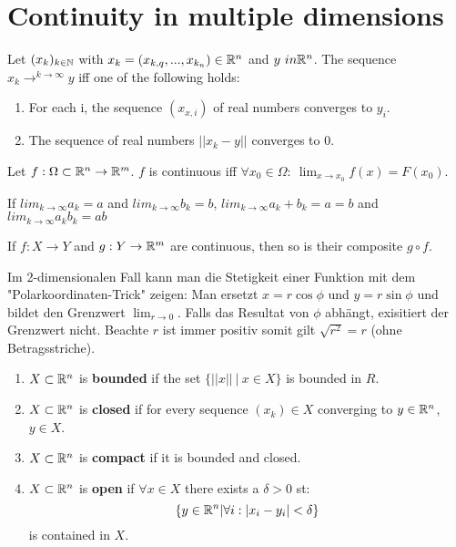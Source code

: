 \chapter{Continuity in multiple dimensions}

\begin{definition}[Convergence in $R^n$]
	Let $(x_k)_{k \in \mathbb{N}}$ with $x_k = (x_{k,q},...,x_{k_n}) \in \mathbb{R}^n$ and $y \ in \mathbb{R}^n$. 
	The sequence $x_k \to^{k\to\infty} y$ iff one of the following holds:
	\begin{enumerate}
		\item For each i, the sequence $(x_{x,i})$ of real numbers converges to $y_i$.
		\item The sequence of real numbers $||x_k - y||$ converges to 0.
	\end{enumerate}
\end{definition}

\begin{definition}[Continuity]
	Let $f: \Omega \subset \mathbb{R}^n \to \mathbb{R}^m$.
	$f$ is continuous iff $\forall x_0 \in \Omega: \ \lim_{x \to x_0} f(x) = F(x_0)$.
\end{definition}

\begin{theorem}
	If $lim_{k \to \infty}a_k = a$ and  $lim_{k \to \infty} b_k = b$, $lim_{k \to \infty}a_k+b_k = a=b$ and  $lim_{k \to \infty}a_kb_k = ab$ 
\end{theorem}

\begin{proposition}
	If $f: X \to Y$ and $g: Y \to \mathbb{R}^m$ are continuous, then so is their composite $g \circ f$.
\end{proposition}

\begin{remark}
    Im 2-dimensionalen Fall kann man die Stetigkeit einer Funktion mit dem "Polarkoordinaten-Trick" zeigen: Man ersetzt $x = r\cos{\phi}$ und $y = r\sin{\phi}$ und bildet den Grenzwert $\lim_{r \to 0}$. Falls das Resultat von $\phi$ abhängt, exisitiert der Grenzwert nicht. Beachte $r$ ist immer positiv somit gilt $\sqrt{r^2} = r$ (ohne Betragsstriche).
\end{remark}

\begin{definition}
	\begin{enumerate}
		\item $X \subset \mathbb{R}^n$ is \textbf{bounded} if the set $\{||x|| \ | \ x \in X\}$ is bounded in $R$.
		\item $X \subset \mathbb{R}^n$ is \textbf{closed} if for every sequence $(x_k) \in X$ converging to $y \in \mathbb{R}^n$, $y \in X$.
		\item $X \subset \mathbb{R}^n$ is \textbf{compact} if it is bounded and closed.
		\item $X \subset \mathbb{R}^n$ is \textbf{open} if $\forall x \in X$ there exists a $\delta > 0$ st:
			$$\{y \in \mathbb{R}^n | \forall i: |x_i -y_i| < \delta\}$$
			is contained in $X$.
	\end{enumerate}
\end{definition}

